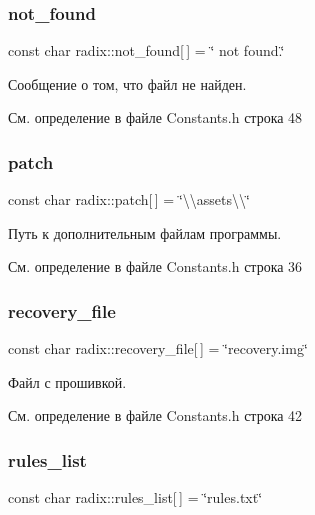 \subsubsection{\texorpdfstring{not\+\_\+found}{not\_found}}
{\footnotesize\ttfamily const char radix\+::not\+\_\+found\mbox{[}$\,$\mbox{]} = \char`\"{} not found.\char`\"{}}

Сообщение о том, что файл не найден. 

См. определение в файле Constants.\+h строка 48

\mbox{\label{namespaceradix_aa90f63f1d0143b58469670ccbb86cfc4}} 
\subsubsection{\texorpdfstring{patch}{patch}}
{\footnotesize\ttfamily const char radix\+::patch\mbox{[}$\,$\mbox{]} = \char`\"{}\textbackslash{}\textbackslash{}assets\textbackslash{}\textbackslash{}\char`\"{}}

Путь к дополнительным файлам программы. 

См. определение в файле Constants.\+h строка 36

\mbox{\label{namespaceradix_a91c21d6be385236a564ef5bf1f3f3602}} 
\subsubsection{\texorpdfstring{recovery\+\_\+file}{recovery\_file}}
{\footnotesize\ttfamily const char radix\+::recovery\+\_\+file\mbox{[}$\,$\mbox{]} = \char`\"{}recovery.\+img\char`\"{}}

Файл с прошивкой. 

См. определение в файле Constants.\+h строка 42

\mbox{\label{namespaceradix_a73b088a3e903cc2845c2299b9ab8ccaf}} 
\subsubsection{\texorpdfstring{rules\+\_\+list}{rules\_list}}
{\footnotesize\ttfamily const char radix\+::rules\+\_\+list\mbox{[}$\,$\mbox{]} = \char`\"{}rules.\+txt\char`\"{}}

